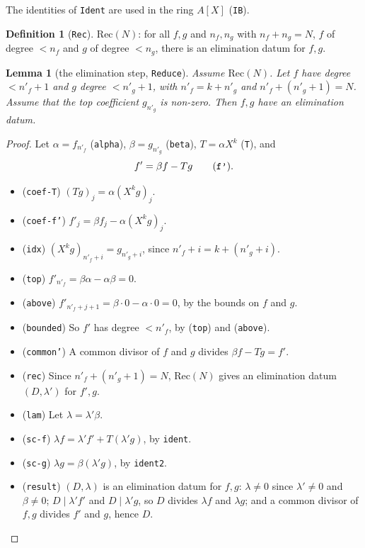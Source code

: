 \documentclass[11pt]{amsart}
\newtheorem{lemma}[theorem]{Lemma}
\theoremstyle{definition}
\newtheorem{definition}[theorem]{Definition}
\theoremstyle{remark}
\newcommand{\nm}[1]{\textup{\texttt{#1}}}
\begin{document}
\noindent The identities of \nm{Ident} are used in the ring $A[X]$
(\nm{IB}).

\begin{definition}[\nm{Rec}]
$\mathrm{Rec}(N)$: for all $f,g$ and $n_f,n_g$ with $n_f+n_g = N$, $f$ of
degree $<n_f$ and $g$ of degree $<n_g$, there is an elimination datum for
$f,g$.
\end{definition}

\begin{lemma}[the elimination step, \nm{Reduce}]\label{lem:reduce}
Assume $\mathrm{Rec}(N)$. Let $f$ have degree $<n'_f+1$ and $g$ degree
$<n'_g+1$, with $n'_f = k + n'_g$ and $n'_f + (n'_g+1) = N$. Assume that
the top coefficient $g_{n'_g}$ is non-zero. Then $f,g$ have an
elimination datum.
\end{lemma}
\begin{proof}
Let $\alpha = f_{n'_f}$ (\nm{alpha}), $\beta = g_{n'_g}$ (\nm{beta}),
$T = \alpha X^k$ (\nm{T}), and
\[
  f' = \beta f - Tg\qquad(\nm{f'}).
\]
\begin{itemize}
\item (\nm{coef-T}) $(Tg)_j = \alpha(X^kg)_j$.
\item (\nm{coef-f'}) $f'_j = \beta f_j - \alpha(X^kg)_j$.
\item (\nm{idx}) $(X^kg)_{n'_f+i} = g_{n'_g+i}$, since
  $n'_f + i = k + (n'_g+i)$.
\item (\nm{top}) $f'_{n'_f} = \beta\alpha - \alpha\beta = 0$.
\item (\nm{above}) $f'_{n'_f+j+1} = \beta\cdot0 - \alpha\cdot0 = 0$,
  by the bounds on $f$ and $g$.
\item (\nm{bounded}) So $f'$ has degree $<n'_f$, by (\nm{top}) and
  (\nm{above}).
\item (\nm{common'}) A common divisor of $f$ and $g$ divides
  $\beta f - Tg = f'$.
\item (\nm{rec}) Since $n'_f + (n'_g+1) = N$, $\mathrm{Rec}(N)$ gives an
  elimination datum $(D,\lambda')$ for $f',g$.
\item (\nm{lam}) Let $\lambda = \lambda'\beta$.
\item (\nm{sc-f}) $\lambda f = \lambda'f' + T(\lambda'g)$, by
  \nm{ident}.
\item (\nm{sc-g}) $\lambda g = \beta(\lambda'g)$, by \nm{ident2}.
\item (\nm{result}) $(D,\lambda)$ is an elimination datum for $f,g$:
  $\lambda\neq0$ since $\lambda'\neq0$ and $\beta\neq0$;
  $D\mid\lambda'f'$ and $D\mid\lambda'g$, so $D$ divides $\lambda f$ and
  $\lambda g$; and a common divisor of $f,g$ divides $f'$ and $g$, hence
  $D$.\qedhere
\end{itemize}
\end{proof}
\end{document}
